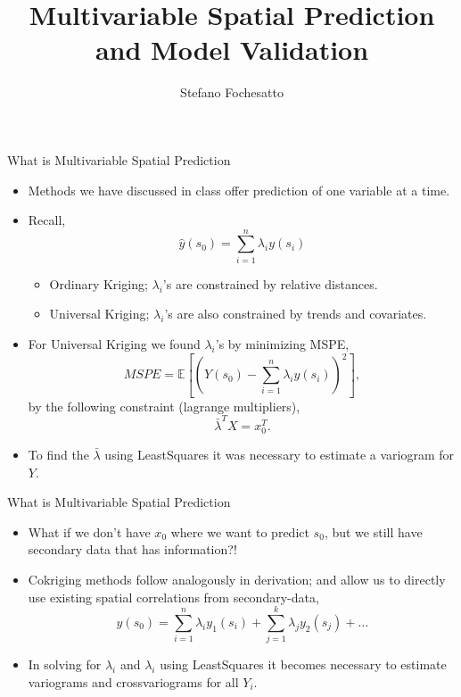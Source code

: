 \documentclass[10pt]{beamer}
\title{Multivariable Spatial Prediction and Model Validation}
\subtitle{}
\date{}
\author{Stefano Fochesatto}
\begin{document}
\maketitle


\begin{frame}{What is Multivariable Spatial Prediction}
    \begin{itemize}
        \item Methods we have discussed in class offer prediction of one variable at a time.     
        \item Recall,
        \begin{equation*}
            \hat{y}(s_0) = \sum_{i = 1}^n \lambda_i y(s_i) 
        \end{equation*}
        \begin{itemize}
            \item Ordinary Kriging; $\lambda_i$'s are constrained by relative distances.
            \item Universal Kriging; $\lambda_i$'s are also constrained by trends and covariates. 
        \end{itemize}
        \vfill
        \item For Universal Kriging we found $\lambda_i$'s by minimizing MSPE,
        \begin{equation*}
            MSPE = \mathbb{E}\left[\left( Y(s_0) - \sum_{i = 1}^n \lambda_i y(s_i)\right)^2 \right],
        \end{equation*}
        by the following constraint (lagrange multipliers), 
        \begin{equation*}
            \bar{\lambda}^TX = x_0^T.
        \end{equation*}
        \item To find the $\bar{\lambda}$ using Least\-Squares it was necessary to estimate a variogram for $Y$. 
    \end{itemize}
\end{frame}


\begin{frame}{What is Multivariable Spatial Prediction}
    \begin{itemize}
    \item What if we don't have $x_0$ where we want to predict $s_0$, but we still have secondary data that has information?!
    \vfill
    \item Cokriging methods follow analogously in derivation; and allow us to directly use existing spatial correlations from secondary-data,
        \begin{equation*}
            \hat{y}(s_0) = \sum_{i = 1}^n\lambda_{i} y_1(s_i)   +  \sum_{j = 1}^k \lambda_{j} y_2(s_j) + \dots
        \end{equation*} 
    \item In solving for $\lambda_{i}$ and $\lambda_{i}$ using Least\-Squares it becomes necessary to estimate variograms and cross\-variograms for all $Y_i$. 
    \end{itemize}
\end{frame}
\end{document}
